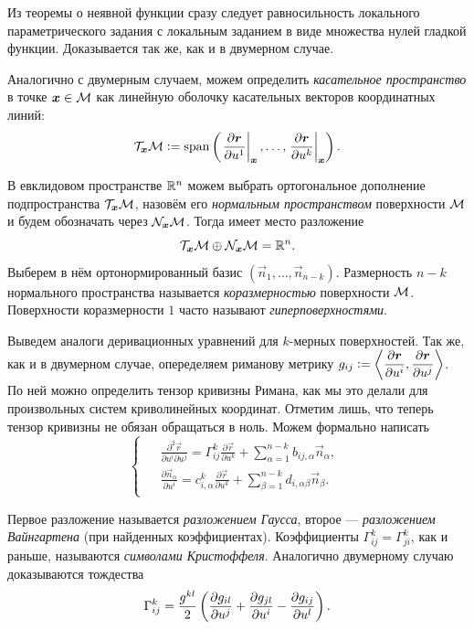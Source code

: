 Из теоремы о неявной функции сразу следует равносильность локального параметрического задания с локальным заданием в виде множества нулей гладкой функции. Доказывается так же, как и в двумерном случае.

Аналогично с двумерным случаем, можем определить \textit{касательное пространство} в точке $\boldsymbol{x} \in \mathcal{M}$ как линейную оболочку касательных векторов координатных линий:
\[
	\mathcal{T}_{\boldsymbol{x}}\mathcal{M} \vcentcolon = \operatorname{span}\left(\left.\frac{\partial\boldsymbol{r}}{\partial u^1}\right|_{\boldsymbol{x}}, \ldots, \left.\frac{\partial\boldsymbol{r}}{\partial u^k}\right|_{\boldsymbol{x}}\right).
\]

В евклидовом пространстве $\mathbb{R}^n$ можем выбрать ортогональное дополнение подпространства $\mathcal{T}_{\boldsymbol{x}}\mathcal{M}$, назовём его \textit{нормальным пространством} поверхности $\mathcal{M}$ и будем обозначать через $\mathcal{N}_{\boldsymbol{x}}\mathcal{M}$. Тогда имеет место разложение
\[
	\mathcal{T}_{\boldsymbol{x}}\mathcal{M} \oplus \mathcal{N}_{\boldsymbol{x}}\mathcal{M} = \mathbb{R}^n.
\]
Выберем в нём ортонормированный базис $(\vec{n}_1, \ldots, \vec{n}_{n - k})$. Размерность $n - k$ нормального пространства называется \textit{коразмерностью} поверхности $\mathcal{M}$. Поверхности коразмерности $1$ часто называют \textit{гиперповерхностями}.

Выведем аналоги деривационных уравнений для $k$-мерных поверхностей. Так же, как и в двумерном случае, опеределяем риманову метрику $\displaystyle g_{ij} \vcentcolon = \left\langle\frac{\partial\boldsymbol{r}}{\partial u^i}, \frac{\partial\boldsymbol{r}}{\partial u^j}\right\rangle$. По ней можно определить тензор кривизны Римана, как мы это делали для произвольных систем криволинейных координат. Отметим лишь, что теперь тензор кривизны не обязан обращаться в ноль. Можем формально написать
\[
	\begin{cases}
		\begin{aligned}
			&\frac{\partial^2\vec{r}}{\partial u^i \partial u^j} = \Gamma_{ij}^k\frac{\partial\vec{r}}{\partial u^k} + \sum_{\alpha = 1}^{n - k}b_{ij, \alpha}\vec{n}_\alpha,\\
			&\frac{\partial\vec{n}_\alpha}{\partial u^i} = c_{i, \alpha}^k\frac{\partial\vec{r}}{\partial u^k} + \sum_{\beta = 1}^{n - k}d_{i, \alpha\beta}\vec{n}_\beta.
		\end{aligned}
	\end{cases}
\]

Первое разложение называется \textit{разложением Гаусса}, второе --- \textit{разложением Вайнгартена} (при найденных коэффициентах). Коэффициенты $\Gamma_{ij}^k = \Gamma_{ji}^k$, как и раньше, называются \textit{символами Кристоффеля}. Аналогично двумерному случаю доказываются тождества
\[
	\Gamma_{ij}^k = \frac{g^{kl}}{2}\left(\frac{\partial g_{il}}{\partial u^j} + \frac{\partial g_{jl}}{\partial u^i} - \frac{\partial g_{ij}}{\partial u^l}\right).
\]

